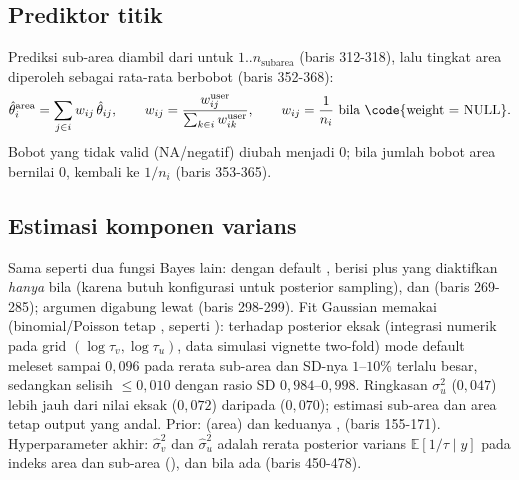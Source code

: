 \subsection{Prediktor titik}\label{sec:hbtwofold-prediktor}

Prediksi sub-area diambil dari  untuk
$1..n_{\text{subarea}}$ (baris 312-318), lalu tingkat area diperoleh sebagai
rata-rata berbobot (baris 352-368):
\begin{equation}
  \hat\theta^{\text{area}}_i=\sum_{j\in i}w_{ij}\,\hat\theta_{ij},
  \qquad
  w_{ij}=\frac{w_{ij}^{\text{user}}}{\sum_{k\in i}w_{ik}^{\text{user}}},
  \qquad w_{ij}=\frac1{n_i}\ \text{bila \code{weight = NULL}}.
  \label{eq:hbtwofold-area}
\end{equation}
Bobot yang tidak valid (NA/negatif) diubah menjadi $0$; bila jumlah bobot
area bernilai $0$, kembali ke $1/n_i$ (baris 353-365).

\subsection{Estimasi komponen varians}\label{sec:hbtwofold-varians}

Sama seperti dua fungsi Bayes lain:  dengan
 default ,  berisi
 plus  yang diaktifkan \emph{hanya}
bila  (karena butuh konfigurasi untuk posterior
sampling), dan  (baris 269-285); argumen
 digabung lewat  (baris 298-299).
Fit Gaussian memakai  (binomial/Poisson tetap , seperti ): terhadap posterior eksak (integrasi
numerik pada grid $(\log\tau_v,\log\tau_u)$, data simulasi vignette two-fold)
mode default  meleset sampai $0{,}096$ pada rerata sub-area dan
SD-nya $1$--$10\%$ terlalu besar, sedangkan  selisih $\le0{,}010$
dengan rasio SD $0{,}984$--$0{,}998$. Ringkasan $\sigma_u^2$ 
($0{,}047$) lebih jauh dari nilai eksak ($0{,}072$) daripada 
($0{,}070$); estimasi sub-area dan area tetap output yang andal.
Prior:  (area) dan  keduanya
,  
(baris 155-171). Hyperparameter akhir: $\hat\sigma_v^2$ dan $\hat\sigma_u^2$
adalah rerata posterior varians $\mathbb E[1/\tau\mid y]$ pada indeks area dan
sub-area (), dan  bila ada (baris
450-478).

